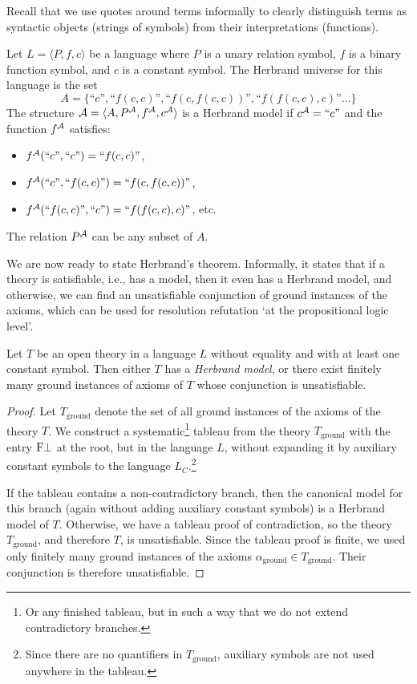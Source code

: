 Recall that we use quotes around terms informally to clearly distinguish terms as syntactic objects (strings of symbols) from their interpretations (functions).

\begin{example}
Let $L=\langle P,f,c\rangle$ be a language where $P$ is a unary relation symbol, $f$ is a binary function symbol, and $c$ is a constant symbol. The Herbrand universe for this language is the set
$$
A=\{\text{``$c$''},\text{``$f(c,c)$''},\text{``$f(c,f(c,c))$''},\text{``$f(f(c,c),c)$''}\dots\}
$$
The structure $\mathcal{A}=\langle A,P^{\mathcal{A}},f^{\mathcal{A}},c^{\mathcal{A}}\rangle$ is a Herbrand model if $c^{\mathcal{A}}=\text{``$c$''}$ and the function $f^{\mathcal{A}}$ satisfies:
\begin{itemize}
    \item $f^{\mathcal{A}}(\text{``$c$''},\text{``$c$''})=\text{``$f(c,c)$''}$,
    \item $f^{\mathcal{A}}(\text{``$c$''},\text{``$f(c,c)$''})=\text{``$f(c,f(c,c))$''}$,
    \item $f^{\mathcal{A}}(\text{``$f(c,c)$''},\text{``$c$''})=\text{``$f(f(c,c),c)$''}$, etc.
\end{itemize}
The relation $P^{\mathcal{A}}$ can be any subset of $A$.
\end{example}

We are now ready to state Herbrand's theorem. Informally, it states that if a theory is satisfiable, i.e., has a model, then it even has a Herbrand model, and otherwise, we can find an unsatisfiable conjunction of ground instances of the axioms, which can be used for resolution refutation `at the propositional logic level'.

\begin{theorem}
Let $T$ be an open theory in a language $L$ without equality and with at least one constant symbol. Then either $T$ has a \emph{Herbrand model}, or there exist finitely many ground instances of axioms of $T$ whose conjunction is unsatisfiable.
\end{theorem}
\begin{proof}
Let $T_\text{ground}$ denote the set of all ground instances of the axioms of the theory $T$. We construct a systematic\footnote{Or any finished tableau, but in such a way that we do not extend contradictory branches.} tableau from the theory $T_\text{ground}$ with the entry $\mathrm{F}\bot$ at the root, but in the language $L$, without expanding it by auxiliary constant symbols to the language $L_C$.\footnote{Since there are no quantifiers in $T_\text{ground}$, auxiliary symbols are not used anywhere in the tableau.}

If the tableau contains a non-contradictory branch, then the canonical model for this branch (again without adding auxiliary constant symbols) is a Herbrand model of $T$. Otherwise, we have a tableau proof of contradiction, so the theory $T_\text{ground}$, and therefore $T$, is unsatisfiable. Since the tableau proof is finite, we used only finitely many ground instances of the axioms $\alpha_\text{ground}\in T_\text{ground}$. Their conjunction is therefore unsatisfiable.
\end{proof}

